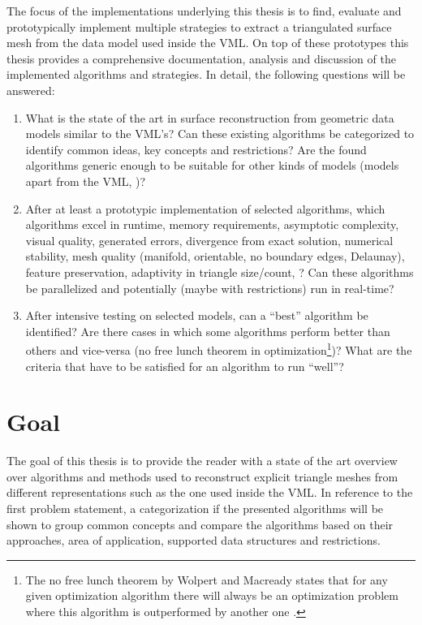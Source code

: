 The focus of the implementations underlying this thesis is to find, evaluate and prototypically implement multiple strategies to extract a triangulated surface mesh from the data model used inside the VML.
On top of these prototypes this thesis provides a comprehensive documentation, analysis and discussion of the implemented algorithms and strategies.
In detail, the following questions will be answered:

\begin{enumerate}
	\item What is the state of the art in surface reconstruction from geometric data models similar to the VML's?
	Can these existing algorithms be categorized to identify common ideas, key concepts and restrictions?
	Are the found algorithms generic enough to be suitable for other kinds of models (models apart from the VML, \cf)?
	
	\item After at least a prototypic implementation of selected algorithms, which algorithms excel in runtime, memory requirements, asymptotic complexity, visual quality, generated errors, divergence from exact solution, numerical stability, mesh quality (manifold, orientable, no boundary edges, Delaunay), feature preservation, adaptivity in triangle size/count, \etc? %
	Can these algorithms be parallelized and potentially (maybe with restrictions) run in real-time?
	
	\item After intensive testing on selected models, can a \enquote{best} algorithm be identified?
	Are there cases in which some algorithms perform better than others and vice-versa (\cf no free lunch theorem in optimization\footnote{The no free lunch theorem by Wolpert and Macready states that for any given optimization algorithm there will always be an optimization problem where this algorithm is outperformed by another one \cite{no_free_lunch}. })?
	What are the criteria that have to be satisfied for an algorithm to run \enquote{well}?
\end{enumerate}


\section{Goal}
\label{sec:goal}

The goal of this thesis is to provide the reader with a state of the art overview over algorithms and methods used to reconstruct explicit triangle meshes from different representations such as the one used inside the VML.
In reference to the first problem statement, a categorization if the presented algorithms will be shown to group common concepts and compare the algorithms based on their approaches, area of application, supported data structures and restrictions.

